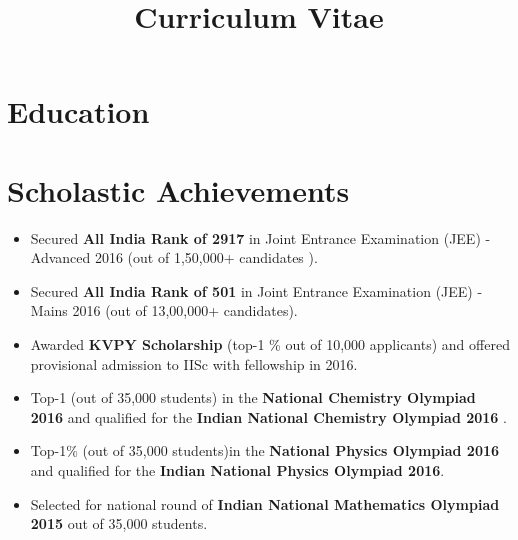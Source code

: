 \documentclass[11pt,a4paper,sans]{moderncv}        %
\title{Curriculum Vitae}                               %
\begin{document}
\makecvtitle

\section{Education}

\section{Scholastic Achievements}
\begin{itemize}
\item Secured \textbf{All India Rank of 2917 }in Joint Entrance Examination (JEE) -Advanced 2016 (out of 1,50,000+ candidates ).
\item  Secured \textbf{All India Rank of 501} in Joint Entrance Examination (JEE) -Mains 2016 (out of 13,00,000+ candidates).
\item Awarded \textbf{KVPY Scholarship} (top-1 \% out of 10,000 applicants) and offered provisional admission to IISc with fellowship in 2016.
\item Top-1 (out of 35,000 students) in the \textbf{National Chemistry Olympiad 2016} and qualified for the \textbf{Indian National Chemistry Olympiad 2016} .
\item  Top-1\% (out of 35,000 students)in the \textbf{National Physics Olympiad 2016} and qualified for the \textbf{Indian National Physics Olympiad 2016}.
\item Selected for national round of \textbf{Indian National Mathematics Olympiad 2015} out of 35,000 students.
\end{itemize}
\end{document}
